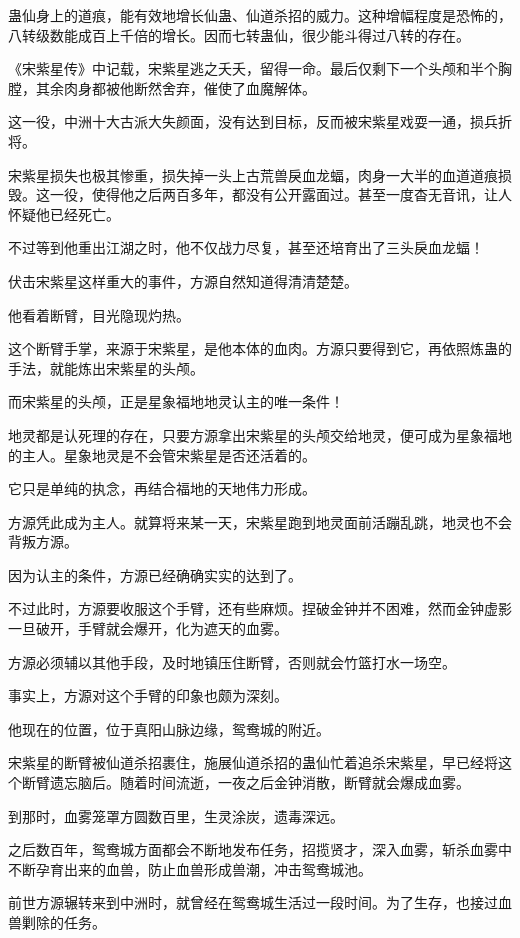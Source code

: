 \begin{this_body}
蛊仙身上的道痕，能有效地增长仙蛊、仙道杀招的威力。这种增幅程度是恐怖的，八转级数能成百上千倍的增长。因而七转蛊仙，很少能斗得过八转的存在。

《宋紫星传》中记载，宋紫星逃之夭夭，留得一命。最后仅剩下一个头颅和半个胸膛，其余肉身都被他断然舍弃，催使了血魔解体。

这一役，中洲十大古派大失颜面，没有达到目标，反而被宋紫星戏耍一通，损兵折将。

宋紫星损失也极其惨重，损失掉一头上古荒兽戾血龙蝠，肉身一大半的血道道痕损毁。这一役，使得他之后两百多年，都没有公开露面过。甚至一度杳无音讯，让人怀疑他已经死亡。

不过等到他重出江湖之时，他不仅战力尽复，甚至还培育出了三头戾血龙蝠！

伏击宋紫星这样重大的事件，方源自然知道得清清楚楚。

他看着断臂，目光隐现灼热。

这个断臂手掌，来源于宋紫星，是他本体的血肉。方源只要得到它，再依照炼蛊的手法，就能炼出宋紫星的头颅。

而宋紫星的头颅，正是星象福地地灵认主的唯一条件！

地灵都是认死理的存在，只要方源拿出宋紫星的头颅交给地灵，便可成为星象福地的主人。星象地灵是不会管宋紫星是否还活着的。

它只是单纯的执念，再结合福地的天地伟力形成。

方源凭此成为主人。就算将来某一天，宋紫星跑到地灵面前活蹦乱跳，地灵也不会背叛方源。

因为认主的条件，方源已经确确实实的达到了。

不过此时，方源要收服这个手臂，还有些麻烦。捏破金钟并不困难，然而金钟虚影一旦破开，手臂就会爆开，化为遮天的血雾。

方源必须辅以其他手段，及时地镇压住断臂，否则就会竹篮打水一场空。

事实上，方源对这个手臂的印象也颇为深刻。

他现在的位置，位于真阳山脉边缘，鸳鸯城的附近。

宋紫星的断臂被仙道杀招裹住，施展仙道杀招的蛊仙忙着追杀宋紫星，早已经将这个断臂遗忘脑后。随着时间流逝，一夜之后金钟消散，断臂就会爆成血雾。

到那时，血雾笼罩方圆数百里，生灵涂炭，遗毒深远。

之后数百年，鸳鸯城方面都会不断地发布任务，招揽贤才，深入血雾，斩杀血雾中不断孕育出来的血兽，防止血兽形成兽潮，冲击鸳鸯城池。

前世方源辗转来到中洲时，就曾经在鸳鸯城生活过一段时间。为了生存，也接过血兽剿除的任务。


\end{this_body}
